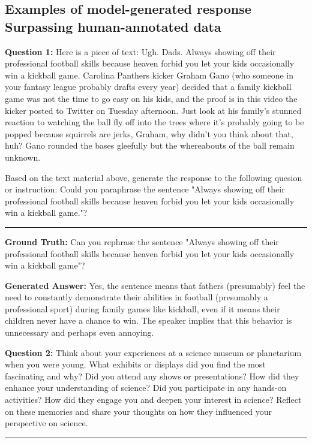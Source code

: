 \clearpage
%
\begin{appendices}
\section{Examples of model-generated response Surpassing human-annotated data}
\label{appendix a}

\textbf{Question 1:} Here is a piece of text: Ugh. Dads. Always showing off their professional football skills because heaven forbid you let your kids occasionally win a kickball game.
Carolina Panthers kicker Graham Gano (who someone in your fantasy league probably drafts every year) decided that a family kickball game was not the time to go easy on his kids, and the proof is in this video the kicker posted to Twitter on Tuesday afternoon.
Just look at his family's stunned reaction to watching the ball fly off into the trees where it's probably going to be popped because squirrels are jerks, Graham, why didn't you think about that, huh?
Gano rounded the bases gleefully but the whereabouts of the ball remain unknown.

Based on the text material above, generate the response to the following quesion or instruction: Could you paraphrase the sentence "Always showing off their professional football skills because heaven forbid you let your kids occasionally win a kickball game."? \\
\rule{\linewidth}{0.4pt}

\noindent \textbf{Ground Truth:} Can you rephrase the sentence "Always showing off their professional football skills because heaven forbid you let your kids occasionally win a kickball game"?

\noindent \textbf{Generated Answer:} Yes, the sentence means that fathers (presumably) feel the need to constantly demonstrate their abilities in football (presumably a professional sport) during family games like kickball, even if it means their children never have a chance to win. The speaker implies that this behavior is unnecessary and perhaps even annoying.

\noindent \textbf{Question 2:} Think about your experiences at a science museum or planetarium when you were young. What exhibits or displays did you find the most fascinating and why? Did you attend any shows or presentations? How did they enhance your understanding of science? Did you participate in any hands-on activities? How did they engage you and deepen your interest in science? Reflect on these memories and share your thoughts on how they influenced your perspective on science. \\
\rule{\linewidth}{0.4pt}


\end{appendices}
